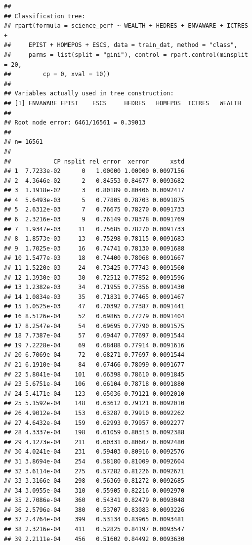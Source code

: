 \documentclass[]{book}
\begin{document}
\begin{verbatim}
## 
## Classification tree:
## rpart(formula = science_perf ~ WEALTH + HEDRES + ENVAWARE + ICTRES + 
##     EPIST + HOMEPOS + ESCS, data = train_dat, method = "class", 
##     parms = list(split = "gini"), control = rpart.control(minsplit = 20, 
##         cp = 0, xval = 10))
## 
## Variables actually used in tree construction:
## [1] ENVAWARE EPIST    ESCS     HEDRES   HOMEPOS  ICTRES   WEALTH  
## 
## Root node error: 6461/16561 = 0.39013
## 
## n= 16561 
## 
##            CP nsplit rel error  xerror      xstd
## 1  7.7233e-02      0   1.00000 1.00000 0.0097156
## 2  4.3646e-02      2   0.84553 0.84677 0.0093682
## 3  1.1918e-02      3   0.80189 0.80406 0.0092417
## 4  5.6493e-03      5   0.77805 0.78703 0.0091875
## 5  2.6312e-03      7   0.76675 0.78270 0.0091733
## 6  2.3216e-03      9   0.76149 0.78378 0.0091769
## 7  1.9347e-03     11   0.75685 0.78270 0.0091733
## 8  1.8573e-03     13   0.75298 0.78115 0.0091683
## 9  1.7025e-03     16   0.74741 0.78130 0.0091688
## 10 1.5477e-03     18   0.74400 0.78068 0.0091667
## 11 1.5220e-03     24   0.73425 0.77743 0.0091560
## 12 1.3930e-03     30   0.72512 0.77852 0.0091596
## 13 1.2382e-03     34   0.71955 0.77356 0.0091430
## 14 1.0834e-03     35   0.71831 0.77465 0.0091467
## 15 1.0525e-03     47   0.70392 0.77387 0.0091441
## 16 8.5126e-04     52   0.69865 0.77279 0.0091404
## 17 8.2547e-04     54   0.69695 0.77790 0.0091575
## 18 7.7387e-04     57   0.69447 0.77697 0.0091544
## 19 7.2228e-04     69   0.68488 0.77914 0.0091616
## 20 6.7069e-04     72   0.68271 0.77697 0.0091544
## 21 6.1910e-04     84   0.67466 0.78099 0.0091677
## 22 5.8041e-04    101   0.66398 0.78610 0.0091845
## 23 5.6751e-04    106   0.66104 0.78718 0.0091880
## 24 5.4171e-04    123   0.65036 0.79121 0.0092010
## 25 5.1592e-04    148   0.63612 0.79121 0.0092010
## 26 4.9012e-04    153   0.63287 0.79910 0.0092262
## 27 4.6432e-04    159   0.62993 0.79957 0.0092277
## 28 4.3337e-04    198   0.61059 0.80313 0.0092388
## 29 4.1273e-04    211   0.60331 0.80607 0.0092480
## 30 4.0241e-04    231   0.59403 0.80916 0.0092576
## 31 3.8694e-04    254   0.58180 0.81009 0.0092604
## 32 3.6114e-04    275   0.57282 0.81226 0.0092671
## 33 3.3166e-04    298   0.56369 0.81272 0.0092685
## 34 3.0955e-04    310   0.55905 0.82216 0.0092970
## 35 2.7086e-04    360   0.54341 0.82479 0.0093048
## 36 2.5796e-04    380   0.53707 0.83083 0.0093226
## 37 2.4764e-04    399   0.53134 0.83965 0.0093481
## 38 2.3216e-04    411   0.52825 0.84197 0.0093547
## 39 2.2111e-04    456   0.51602 0.84492 0.0093630

\end{verbatim}
\end{document}

